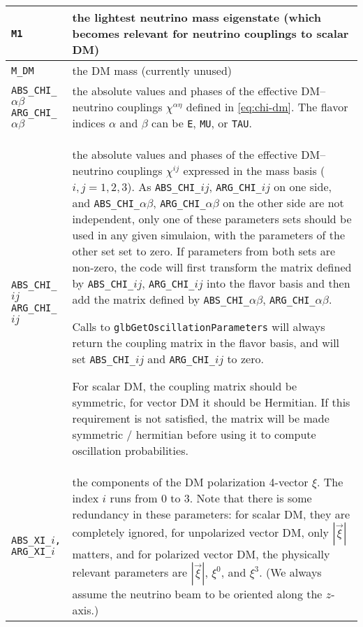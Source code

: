 \documentclass{scrartcl}
\begin{document}
\begin{table}[h]
\centering
\begin{tabular}{p{4.0cm}p{9.5cm}}
  \toprule
  \tt M1     & the lightest neutrino mass eigenstate (which becomes relevant
               for neutrino couplings to scalar DM) \\
  \midrule
  \tt M_DM   & the DM mass (currently unused) \\
  \midrule
  \tt ABS_CHI_$\alpha\beta$ \newline
      ARG_CHI_$\alpha\beta$
             & the absolute values and phases of the effective DM--neutrino
               couplings $\chi^{\alpha\eta}$ defined in \cref{eq:chi-dm}. The flavor
               indices $\alpha$ and $\beta$ can be {\tt E}, {\tt MU}, or
               {\tt TAU}.\\
  \midrule
  \tt ABS_CHI_$ij$ \newline
      ARG_CHI_$ij$
             & the absolute values and phases of the effective DM--neutrino
               couplings $\chi^{ij}$ expressed in the mass basis ($i,j = 1,2,3$).
               As {\tt ABS_CHI_$ij$}, {\tt ARG_CHI_$ij$} on one side, and
               {\tt ABS_CHI_$\alpha\beta$}, {\tt ARG_CHI_$\alpha\beta$} on the
               other side are not independent, only one of these parameters sets
               should be used in any given simulaion, with the parameters of the
               other set set to zero. If parameters from both sets are non-zero,
               the code will first transform the matrix defined by
               {\tt ABS_CHI_$ij$}, {\tt ARG_CHI_$ij$} into the flavor basis
               and then add the matrix defined by {\tt ABS_CHI_$\alpha\beta$},
               {\tt ARG_CHI_$\alpha\beta$}.

               Calls to {\tt glbGetOscillationParameters} will always return
               the coupling matrix in the flavor basis, and will set
               {\tt ABS_CHI_$ij$} and {\tt ARG_CHI_$ij$} to zero.

               For scalar DM, the coupling matrix should be symmetric, for
               vector DM it should be Hermitian. If this requirement is
               not satisfied, the matrix will be made symmetric / hermitian
               before using it to compute oscillation probabilities.
               \\
  \midrule
  \tt ABS_XI_$i$, ARG_XI_$i$
             & the components of the DM polarization 4-vector $\xi$. The index
               $i$ runs from 0 to 3. Note that there is some redundancy in these
               parameters: for scalar DM, they are completely ignored, for
               unpolarized vector DM, only $|\vec\xi|$ matters, and for
               polarized vector DM, the physically relevant parameters
               are $|\vec\xi|$, $\xi^0$, and $\xi^3$. (We always assume the
               neutrino beam to be oriented along the $z$-axis.) \\
  \bottomrule
\end{tabular}
\end{table}
\end{document}
